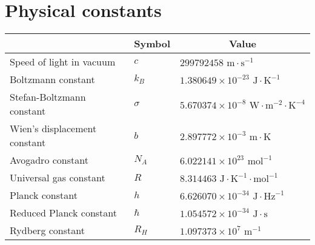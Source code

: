 \documentclass[../main.tex]{subfiles}
\begin{document}
\section{Physical constants}
\begin{center}
    \begin{tabular}{|l|l|l|}
        \hline
        \rowcolor{gray!40}
        \multicolumn{1}{|c|}{\bfseries Quantity} & \multicolumn{1}{c|}{\bfseries Symbol} & \multicolumn{1}{c|}{\bfseries Value}                                      \\
        \hline\rowcolor{gray!10}
        Speed of light in vacuum                 & $c$                                   & $299792458\text{ m}\cdot\text{s}^{-1}$                                    \\
        \hline\rowcolor{gray!10}
        Boltzmann constant                       & $k_B$                                 & $1.380649\times 10^{-23}\text{ J}\cdot\text{K}^{-1}$                      \\
        \hline\rowcolor{gray!10}
        Stefan-Boltzmann constant                & $\sigma$                              & $5.670374\times 10^{-8}\text{ W}\cdot\text{m}^{-2}\cdot\text{K}^{-4}$     \\
        \hline\rowcolor{gray!10}
        Wien's displacement constant             & $b$                                   & $2.897772\times 10^{-3}\text{ m}\cdot\text{K}$                            \\
        \hline\rowcolor{gray!10}
        Avogadro constant                        & $N_A$                                 & $6.022141\times 10^{23}\text{ mol}^{-1}$                                  \\
        \hline\rowcolor{gray!10}
        Universal gas constant                   & $R$                                   & $8.314463\text{ J}\cdot\text{K}^{-1}\cdot\text{mol}^{-1}$                 \\
        \hline\rowcolor{gray!10}
        Planck constant                          & $h$                                   & $6.626070\times 10^{-34}\text{ J}\cdot\text{Hz}^{-1}$                     \\
        \hline\rowcolor{gray!10}
        Reduced Planck constant                  & $\hbar$                               & $1.054572\times 10^{-34}\text{ J}\cdot\text{s}$                           \\
        \hline\rowcolor{gray!10}
        Rydberg constant                         & $R_H$                                 & $1.097373\times 10^7\text{ m}^{-1}$                                       \\

\end{tabular}
\end{center}
\end{document}
